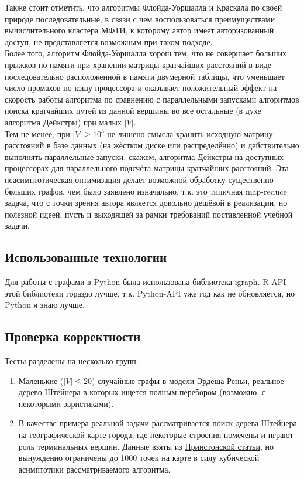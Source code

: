 \documentclass[11pt,a4paper]{report}
\def\le{\leqslant}
\def\ge{\geqslant}
\theoremstyle{definition}
\theoremstyle{definition}
\theoremstyle{definition}
\begin{document}
	\noindent Также стоит отметить, что алгоритмы Флойда-Уоршалла и Краскала по своей природе последовательные, в связи с чем воспользоваться преимуществами вычислительного кластера МФТИ, к которому автор имеет авторизованный доступ, не представляется возможным при таком подходе.\\
	
	\noindent Более того, алгоритм Флойда-Уоршалла хорош тем, что не совершает больших прыжков по памяти при хранении матрицы кратчайших расстояний в виде последовательно расположенной в памяти двумерной таблицы, что уменьшает число промахов по кэшу процессора и оказывает положительный эффект на скорость работы алгоритма по сравнению с параллельными запусками алгоритмов поиска кратчайших путей из данной вершины во все остальные (в духе алгоритма Дейкстры) при малых $|V|$.\\
	
	\noindent Тем не менее, при $|V| \ge 10^3$ не лишено смысла хранить исходную матрицу расстояний в базе данных (на жёстком диске или распределённо) и действительно выполнять параллельные запуски, скажем, алгоритма Дейкстры на доступных процессорах для параллельного подсчёта матрицы кратчайших расстояний. Эта неасимптотическая оптимизация делает возможной обработку существенно б\textbf{о}льших графов, чем было заявлено изначально, т.к. это типичная map-reduce задача, что с точки зрения автора является довольно дешёвой в реализации, но полезной идеей, пусть и выходящей за рамки требований поставленной учебной задачи. 
	
	\subsection{Использованные технологии}
			Для работы с графами в Python была использована библиотека  \href{https://igraph.org/python/}{igraph}. R-API этой библиотеки гораздо лучше, т.к. Python-API уже год как не обновляется, но Python я знаю лучше.
	\subsection{Проверка корректности}
		Тесты разделены на несколько групп:
		\begin{enumerate}
			\item Маленькие ($|V| \le 20$) случайные графы в модели Эрдеша-Реньи, реальное дерево Штейнера в которых ищется полным перебором (возможно, с некоторыми эвристиками).
			\item В качестве примера реальной задачи рассматривается поиск дерева Штейнера на географической карте города, где некоторые строения помечены и играют роль терминальных вершин. Данные взяты из \href{https://homepage.univie.ac.at/ivana.ljubic/research/STP/}{Принстонской статьи}, но вынужденно ограничены до 1000 точек на карте в силу кубической асимптотики рассматриваемого алгоритма.
		\end{enumerate}
\end{document}
